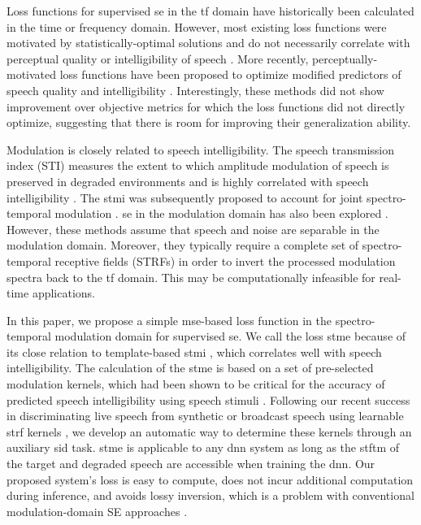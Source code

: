 \documentclass{article}
\begin{document}
Loss functions for supervised \gls{se} in the \gls{tf} domain have historically been   calculated in the time or frequency domain. However, most existing loss functions \cite{braunConsolidatedViewLoss2020} were motivated by statistically-optimal solutions \cite{ephraimSpeechEnhancementUsing1984,ephraimSpeechEnhancementUsing1985,limEnhancementBandwidthCompression1979} and do not necessarily correlate with perceptual quality or intelligibility of speech \cite{loizouSpeechEnhancementTheory2013}. More recently, perceptually-motivated loss functions have been proposed to optimize modified predictors of speech quality \cite{martin-donasDeepLearningLoss2018} and intelligibility \cite{zhaoPerceptuallyGuidedSpeech2018}. Interestingly, these methods did not show improvement over objective metrics for which the loss functions did not directly optimize, suggesting that there is room for improving their generalization ability.

Modulation is closely related to  speech intelligibility. The speech transmission index (STI)  measures the extent to which amplitude modulation of speech is preserved in degraded environments and is highly correlated with speech intelligibility \cite{steeneken1980physical,paytonMethodDetermineSpeech1999}.  The \gls{stmi} was subsequently proposed to account for joint spectro-temporal modulation \cite{elhilaliSpectrotemporalModulationIndex2003}. \gls{se} in the modulation domain has also been explored \cite{mesgaraniDenoisingDomainSpectrotemporal2007,mirbagheriNonlinearFilteringSpectrotemporal2010}. However, these methods assume that speech and noise are separable in the modulation domain. Moreover, they typically require a complete set of spectro-temporal receptive fields (STRFs)  in order to invert the processed modulation spectra back to the \gls{tf} domain.  This may  be computationally infeasible for real-time applications.

In this paper, we propose a simple \gls{mse}-based loss function in the spectro-temporal modulation domain for supervised \gls{se}. We call the loss \gls{stme} because of its close relation to template-based \gls{stmi} \cite{elhilaliSpectrotemporalModulationIndex2003}, which correlates well with speech intelligibility. The calculation of the \gls{stme} is based on a set of pre-selected modulation kernels, which had been shown to be critical for the accuracy of predicted speech intelligibility using speech stimuli \cite{paytonMethodDetermineSpeech1999}. Following our recent success in discriminating live speech from synthetic or broadcast speech using learnable \gls{strf} kernels \cite{vuong2020learnable}, we develop an automatic way to determine these kernels through an auxiliary \gls{sid} task. \gls{stme} is applicable to any \gls{dnn} system as long as the \gls{stftm} of the target and degraded speech are accessible when training the \gls{dnn}. Our proposed system's loss is easy to compute, does not incur additional computation during inference, and avoids lossy inversion, which is a problem with conventional modulation-domain SE approaches    \cite{mesgaraniDenoisingDomainSpectrotemporal2007}.
\end{document}
